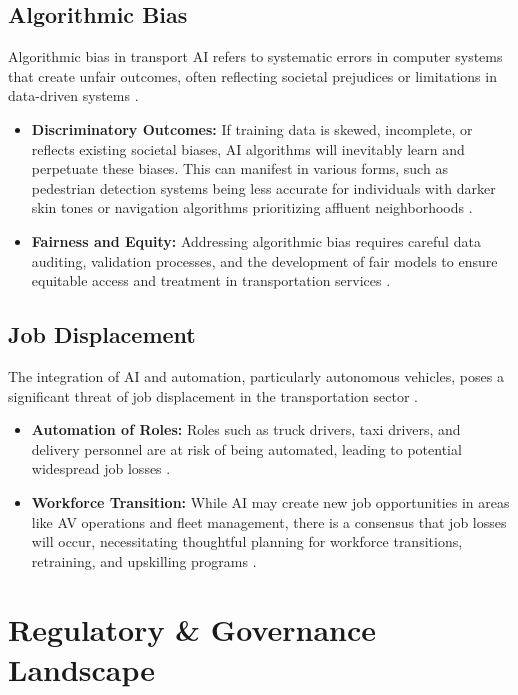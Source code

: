 \subsection{Algorithmic Bias}
Algorithmic bias in transport AI refers to systematic errors in computer systems that create unfair outcomes, often reflecting societal prejudices or limitations in data-driven systems \cite{SustainabilityDirectory_AlgorithmicBias}.
\begin{itemize}
    \item \textbf{Discriminatory Outcomes:} If training data is skewed, incomplete, or reflects existing societal biases, AI algorithms will inevitably learn and perpetuate these biases. This can manifest in various forms, such as pedestrian detection systems being less accurate for individuals with darker skin tones or navigation algorithms prioritizing affluent neighborhoods \cite{SustainabilityDirectory_AlgorithmicBias}.
    \item \textbf{Fairness and Equity:} Addressing algorithmic bias requires careful data auditing, validation processes, and the development of fair models to ensure equitable access and treatment in transportation services \cite{Intertraffic_AlgorithmicBias}.
\end{itemize}

\subsection{Job Displacement}
The integration of AI and automation, particularly autonomous vehicles, poses a significant threat of job displacement in the transportation sector \cite{Medium_JobDisplacement}.
\begin{itemize}
    \item \textbf{Automation of Roles:} Roles such as truck drivers, taxi drivers, and delivery personnel are at risk of being automated, leading to potential widespread job losses \cite{WorkOnPeak_JobDisplacement}.
    \item \textbf{Workforce Transition:} While AI may create new job opportunities in areas like AV operations and fleet management, there is a consensus that job losses will occur, necessitating thoughtful planning for workforce transitions, retraining, and upskilling programs \cite{Linvelo_JobDisplacement, BustedCubicle_JobDisplacement}.
\end{itemize}

\section{Regulatory \& Governance Landscape}

